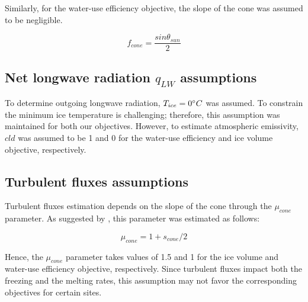\documentclass[tc, manuscript]{copernicus}
\begin{document}
Similarly, for the water-use efficiency objective, the slope of the cone was assumed to be negligible.

\begin{equation}
		f_{cone} =\frac{ sin \theta_{sun} }{2 }
\end{equation}

\subsection{Net longwave radiation \texorpdfstring{$q_{LW}$}{Lg} assumptions} 

To determine outgoing longwave radiation, $T_{ice} = 0 ^{\circ} C$ was assumed. To constrain the minimum ice
temperature is challenging; therefore, this assumption was maintained for both our objectives. However, to
estimate atmospheric emissivity, $cld$ was assumed to be 1 and 0 for the water-use efficiency and ice volume
objective, respectively.

\subsection{Turbulent fluxes assumptions} \label{sec:Qs}

Turbulent fluxes estimation depends on the slope of the cone through the $\mu_{cone}$ parameter. As suggested 
by \citet{oerlemansBriefCommunicationGrowth2021}, this parameter was estimated as follows:

\begin{equation}
  \mu_{cone} =1 + s_{cone}/2
\end{equation}

Hence, the $\mu_{cone}$ parameter takes values of 1.5 and 1 for the ice volume and water-use efficiency
objective, respectively.  Since turbulent fluxes impact both the freezing and the melting rates, this assumption
may not favor the corresponding objectives for certain sites.

\appendixtables   
\end{document}
